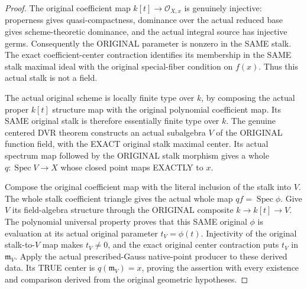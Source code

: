 \begin{proof}
The original coefficient map $k[t]\to\mathcal O_{X,x}$ is genuinely injective:
properness gives quasi-compactness, dominance over the actual reduced base gives
scheme-theoretic dominance, and the actual integral source has injective germs.
Consequently the ORIGINAL parameter is nonzero in the SAME stalk. The exact
coefficient-center contraction identifies its membership in the SAME stalk
maximal ideal with the original special-fiber condition on $f(x)$.
Thus this actual stalk is not a field.

The actual original scheme is locally finite type over $k$, by composing the
actual proper $k[t]$ structure map with the original polynomial coefficient
map. Its SAME original stalk is therefore essentially finite type over $k$.
The genuine centered DVR theorem constructs an actual subalgebra $V$ of the
ORIGINAL function field, with the EXACT original stalk maximal center.
Its actual spectrum map followed by the ORIGINAL stalk morphism gives a whole
$q:\operatorname{Spec}V\to X$ whose closed point maps EXACTLY to $x$.

Compose the original coefficient map with the literal inclusion of the stalk
into $V$. The whole stalk coefficient triangle gives the actual whole map
$qf=\operatorname{Spec}\phi$. Give $V$ its field-algebra structure through the
ORIGINAL composite $k\to k[t]\to V$. The polynomial universal property proves
that this SAME original $\phi$ is evaluation at its actual original parameter
$t_V=\phi(t)$. Injectivity of the original stalk-to-$V$ map makes $t_V\ne0$,
and the exact original center contraction puts $t_V$ in $\mathfrak m_V$.
Apply the actual prescribed-Gauss native-point producer to these derived data.
Its TRUE center is $q(\mathfrak m_V)=x$, proving the assertion with every
existence and comparison derived from the original geometric hypotheses.
\end{proof}
